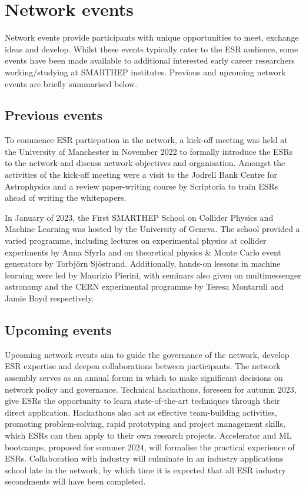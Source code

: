 \section{Network events}
\label{events}
Network events provide participants with unique opportunities to meet, exchange ideas and develop. Whilst these events typically cater to the ESR audience, some events have been made available to additional interested early career researchers working/studying at SMARTHEP institutes. Previous and upcoming network events are briefly summarised below.

\subsection{Previous events}
\label{previous-events}
To commence ESR particpation in the network, a kick-off meeting was held at the University of Manchester in November 2022 to formally introduce the ESRs to the network and discuss network objectives and organisation. Amongst the activities of the kick-off meeting were a visit to the Jodrell Bank Centre for Astrophysics and a review paper-writing course by Scriptoria to train ESRs ahead of writing the whitepapers.

In January of 2023, the First SMARTHEP School on Collider Physics and Machine Learning was hosted by the University of Geneva. The school provided a varied programme, including lectures on experimental physics at collider experiments by Anna Sfyrla and on theoretical physics \& Monte Carlo event generators by Torbj\"orn Sj\"ostrand. Additionally, hands-on lessons in machine learning were led by Maurizio Pierini, with seminars also given on multimessenger astronomy and the CERN experimental programme by Teresa Montaruli and Jamie Boyd respectively.

\subsection{Upcoming events}
\label{upcoming-events}
Upcoming network events aim to guide the governance of the network, develop ESR expertise and deepen collaborations between participants. The network assembly serves as an annual forum in which to make significant decisions on network policy and governance. Technical hackathons, foreseen for autumn $2023$, give ESRs the opportunity to learn state-of-the-art techniques through their direct application. Hackathons also act as effective team-building activities, promoting problem-solving, rapid prototyping and project management skills, which ESRs can then apply to their own research projects. Accelerator and ML bootcamps, proposed for summer $2024$, will formalise the practical experience of ESRs. Collaboration with industry will culminate in an industry applications school late in the network, by which time it is expected that all ESR industry secondments will have been completed.

